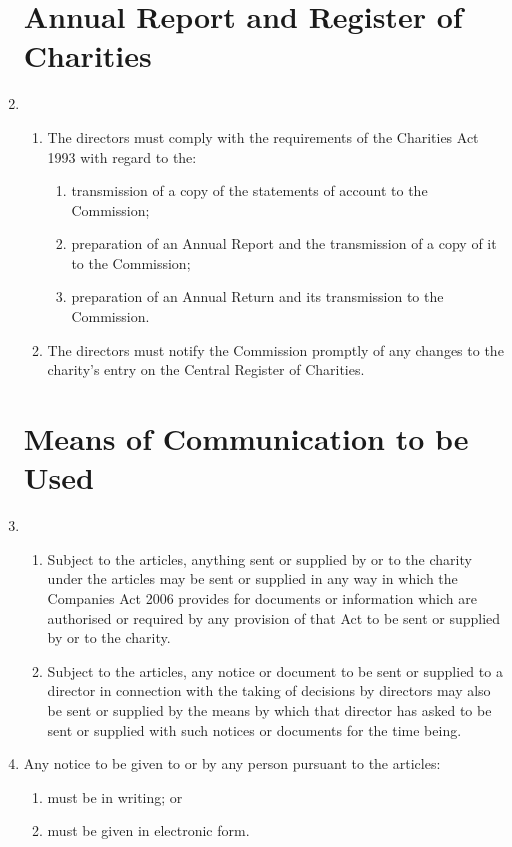 \begin{enumerate}
\section{Annual Report and Register of Charities}

\item
  \begin{enumerate}
  \item
    The directors must comply with the requirements of the Charities
    Act 1993 with regard to the:
    \begin{enumerate}
    \item
      transmission of a copy of the statements of account to the
      Commission;
    \item
      preparation of an Annual Report and the transmission of a copy of
      it to the Commission;
    \item
      preparation of an Annual Return and its transmission to the
      Commission.
    \end{enumerate}
  \item
    The directors must notify the Commission promptly of any changes to
    the charity's entry on the Central Register of Charities.
  \end{enumerate}

\section{Means of Communication to be Used}

\item
  \begin{enumerate}
  \item
    Subject to the articles, anything sent or supplied by or to the
    charity under the articles may be sent or supplied in any way in
    which the Companies Act 2006 provides for documents or information
    which are authorised or required by any provision of that Act to be
    sent or supplied by or to the charity.
  \item
    Subject to the articles, any notice or document to be sent or
    supplied to a director in connection with the taking of decisions
    by directors may also be sent or supplied by the means by which
    that director has asked to be sent or supplied with such notices or
    documents for the time being.
  \end{enumerate}
\item
  Any notice to be given to or by any person pursuant to the
  articles:
  \begin{enumerate}
  \item
    must be in writing; or
  \item
    must be given in electronic form.
  \end{enumerate}


\end{enumerate}
